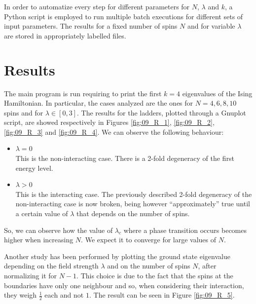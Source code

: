 \documentclass[pra, onecolumn, notitlepage, floats, 11pt]{revtex4-1}
\begin{document}
In order to automatize every step for different parameters for \( N \), \( \lambda \) and \( k \), a Python script is employed to run multiple batch executions for different sets of input parameters. The results for a fixed number of spins \( N \) and for variable \( \lambda \) are stored in appropriately labelled files.





\section{Results}
The main program is run requiring to print the first \( k = 4 \) eigenvalues of the Ising Hamiltonian. In particular, the cases analyzed are the ones for \( N = 4, 6, 8, 10 \) spins and for \( \lambda \in [0,3] \). The results for the ladders, plotted through a Gnuplot script, are showed respectively in Figures \ref{fig:09_R_1}, \ref{fig:09_R_2}, \ref{fig:09_R_3} and \ref{fig:09_R_4}. We can observe the following behaviour:
\begin{itemize}
    \setlength\itemsep{-3pt}
    \item \( \lambda = 0 \)\\
        This is the non-interacting case. There is a 2-fold degeneracy of the first energy level.
    \item \( \lambda > 0 \)\\
        This is the interacting case. The previously described 2-fold degeneracy of the non-interacting case is now broken, being however ``approximately'' true until a certain value of \( \lambda \) that depends on the number of spins.
\end{itemize}
So, we can observe how the value of \( \lambda_{c} \) where a phase transition occurs becomes higher when increasing \( N \). We expect it to converge for large values of \( N \).

Another study has been performed by plotting the ground state eigenvalue depending on the field strength \( \lambda \) and on the number of spins \( N \), after normalizing it for \( N - 1 \). This choice is due to the fact that the spins at the boundaries have only one neighbour and so, when considering their interaction, they weigh \( \frac{1}{2} \) each and not \( 1 \). The result can be seen in Figure \ref{fig:09_R_5}.
\end{document}
